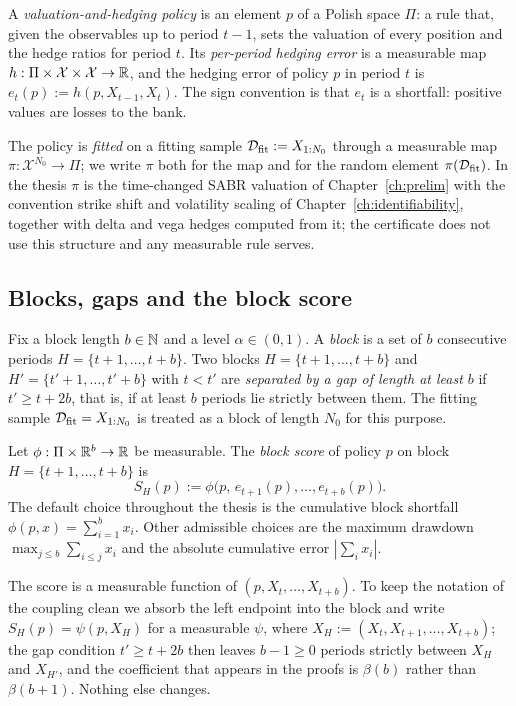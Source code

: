 \documentclass[../../../main.tex]{subfiles}
\begin{document}
A \emph{valuation-and-hedging policy} is an element $p$ of a Polish space $\Pi$: a rule that, given the observables up to period $t-1$, sets the valuation of every position and the hedge ratios for period $t$. Its \emph{per-period hedging error} is a measurable map $h:\Pi\times\mathcal X\times\mathcal X\to\mathbb{R}$, and the hedging error of policy $p$ in period $t$ is $e_t(p):=h(p,X_{t-1},X_t)$. The sign convention is that $e_t$ is a shortfall: positive values are losses to the bank.

The policy is \emph{fitted} on a fitting sample $\mathcal D_{\mathrm{fit}}:=X_{1:N_0}$ through a measurable map $\pi:\mathcal X^{N_0}\to\Pi$; we write $\pi$ both for the map and for the random element $\pi(\mathcal D_{\mathrm{fit}})$. In the thesis $\pi$ is the time-changed SABR valuation of Chapter~\ref{ch:prelim} with the convention strike shift and volatility scaling of Chapter~\ref{ch:identifiability}, together with delta and vega hedges computed from it; the certificate does not use this structure and any measurable rule serves.

\subsection{Blocks, gaps and the block score}

Fix a block length $b\in\mathbb{N}$ and a level $\alpha\in(0,1)$. A \emph{block} is a set of $b$ consecutive periods $H=\{t+1,\dots,t+b\}$. Two blocks $H=\{t+1,\dots,t+b\}$ and $H'=\{t'+1,\dots,t'+b\}$ with $t<t'$ are \emph{separated by a gap of length at least $b$} if $t'\ge t+2b$, that is, if at least $b$ periods lie strictly between them. The fitting sample $\mathcal D_{\mathrm{fit}}=X_{1:N_0}$ is treated as a block of length $N_0$ for this purpose.

\begin{definition}\label{def:score}
Let $\phi:\Pi\times\mathbb{R}^b\to\mathbb{R}$ be measurable. The \emph{block score} of policy $p$ on block $H=\{t+1,\dots,t+b\}$ is
\[
S_H(p):=\phi\big(p,\,e_{t+1}(p),\dots,e_{t+b}(p)\big).
\]
The default choice throughout the thesis is the cumulative block shortfall $\phi(p,x)=\sum_{i=1}^b x_i$. Other admissible choices are the maximum drawdown $\max_{j\le b}\sum_{i\le j}x_i$ and the absolute cumulative error $|\sum_i x_i|$.
\end{definition}

The score is a measurable function of $(p,X_{t},\dots,X_{t+b})$. To keep the notation of the coupling clean we absorb the left endpoint into the block and write $S_H(p)=\psi(p,X_H)$ for a measurable $\psi$, where $X_H:=(X_t,X_{t+1},\dots,X_{t+b})$; the gap condition $t'\ge t+2b$ then leaves $b-1\ge0$ periods strictly between $X_H$ and $X_{H'}$, and the coefficient that appears in the proofs is $\beta(b)$ rather than $\beta(b+1)$. Nothing else changes.
\end{document}
